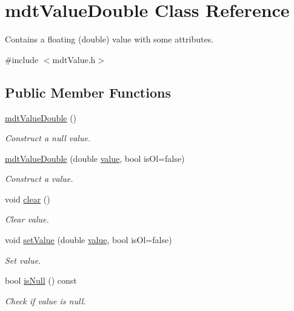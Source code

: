 \hypertarget{classmdt_value_double}{\section{mdt\-Value\-Double Class Reference}
\label{classmdt_value_double}
}


Contains a floating (double) value with some attributes.  




{\ttfamily \#include $<$mdt\-Value.\-h$>$}

\subsection*{Public Member Functions}
\begin{DoxyCompactItemize}
\item 
\hyperlink{classmdt_value_double_a57473b7e157768debe85d5befb98318f}{mdt\-Value\-Double} ()
\begin{DoxyCompactList}\small\item\em Construct a null value. \end{DoxyCompactList}\item 
\hyperlink{classmdt_value_double_afc59d6a0c126244acf8e4105ca75986a}{mdt\-Value\-Double} (double \hyperlink{classmdt_value_double_a41bf83b13cfe7d3779542652f62b8ad6}{value}, bool is\-Ol=false)
\begin{DoxyCompactList}\small\item\em Construct a value. \end{DoxyCompactList}\item 
void \hyperlink{classmdt_value_double_a9f50bab9223b57ab98ade5c507df0aba}{clear} ()
\begin{DoxyCompactList}\small\item\em Clear value. \end{DoxyCompactList}\item 
void \hyperlink{classmdt_value_double_a53697c6d57ad134ed7fde4ac9130e1db}{set\-Value} (double \hyperlink{classmdt_value_double_a41bf83b13cfe7d3779542652f62b8ad6}{value}, bool is\-Ol=false)
\begin{DoxyCompactList}\small\item\em Set value. \end{DoxyCompactList}\item 
bool \hyperlink{classmdt_value_double_a92794bd0d4f70e612c97afb3aac2c530}{is\-Null} () const 
\begin{DoxyCompactList}\small\item\em Check if value is null. \end{DoxyCompactList}\item 

\end{DoxyCompactItemize}
